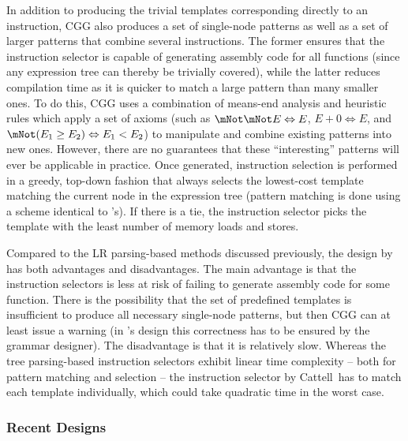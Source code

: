In addition to producing the trivial \glspl{template} corresponding directly to
an \gls{instruction}, \gls{CGG} also produces a set of single-\gls{node}
\glspl{pattern} as well as a set of larger \glspl{pattern} that combine several
\glspl{instruction}.
%
The former ensures that the \gls{instruction selector} is capable of generating
\gls{assembly code} for all \glspl{function} (since any \gls{expression tree}
can thereby be trivially covered), while the latter reduces compilation time as
it is quicker to match a large \gls{pattern} than many smaller ones.
%
To do this, \gls{CGG} uses a combination of \gls{means-end analysis} and
heuristic \glspl{rule} which apply a set of axioms (such as \mbox{$\mNot \mNot E
  \Leftrightarrow E$}, \mbox{$E + 0 \Leftrightarrow E$}, and \mbox{$\mNot (E_1
  \geq E_2) \Leftrightarrow E_1 < E_2$}) to manipulate and combine existing
\glspl{pattern} into new ones.
%
However, there are no guarantees that these ``interesting'' \glspl{pattern} will
ever be applicable in practice.
%
Once generated, \gls{instruction selection} is performed in a greedy, top-down
fashion that always selects the lowest-cost \gls{template} matching the current
\gls{node} in the \gls{expression tree} (\gls{pattern matching} is done using a
scheme identical to \citeauthor{Newcomer:1975}'s).
%
If there is a tie, the \gls{instruction selector} picks the \gls{template} with
the least number of memory loads and stores.

Compared to the \gls{LR parsing}-based methods discussed previously, the design
by \citeauthor{CattellEtAl:1979} has both advantages and disadvantages.
%
The main advantage is that the \glspl{instruction selector} is less at risk of
failing to generate \gls{assembly code} for some \gls{function}.
%
There is the possibility that the set of predefined \glspl{template} is
insufficient to produce all necessary single-node \glspl{pattern}, but then
\gls{CGG} can at least issue a warning (in
\citeauthor{GanapathiEtAl:1982:AttrGr}'s design this correctness has to be
ensured by the \gls{grammar} designer).
%
The disadvantage is that it is relatively slow.
%
Whereas the \gls{tree parsing}-based \glspl{instruction selector} exhibit linear
time complexity -- both for \gls{pattern matching} and selection -- the
\gls{instruction selector} by Cattell~\etal has to match each \gls{template}
individually, which could take quadratic time in the worst case.


\subsubsection{Recent Designs}

